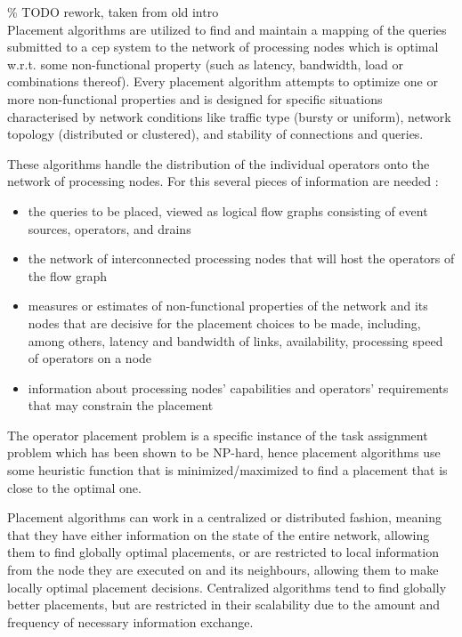 \% TODO rework, taken from old intro \\
Placement algorithms are utilized to find and maintain a mapping of the queries submitted to a \gls{cep} system to the network of processing nodes which is optimal w.r.t. some non-functional property (such as latency, bandwidth, load or combinations thereof).
 Every placement algorithm attempts to optimize one or more non-functional properties and is designed  for specific situations characterised by network conditions like traffic type (bursty or uniform), network topology (distributed or clustered), and stability of connections and queries. 

These algorithms handle the distribution of the individual operators onto the network of processing nodes. For this several pieces of information are needed \cite{Lakshmanan2008a}:
\begin{itemize}
\item the queries to be placed, viewed as logical flow graphs consisting of event sources, operators, and drains
\item the network of interconnected processing nodes that will host the operators of the flow graph
\item measures or estimates of non-functional properties of the network and its nodes that are decisive for the placement choices  to be made, including, among others, latency and bandwidth of links, availability, processing speed of operators on a node 
\item information about processing nodes' capabilities and operators' requirements that may constrain the placement
\end{itemize}

The operator placement problem is a specific instance of the task assignment problem which has been shown to be NP-hard, %
hence placement algorithms use some heuristic function that is minimized/maximized to find a placement that is close to the optimal one.

Placement algorithms can work in a centralized or distributed fashion, meaning that they have either information on the state of the entire network, allowing them to find globally optimal placements, or are restricted to local information from the node they are executed on and its neighbours, allowing them to make locally optimal placement decisions. Centralized algorithms tend to find globally better placements, but are restricted in their scalability due to the amount and frequency of necessary information exchange. 

